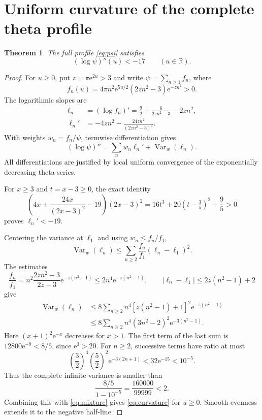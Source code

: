 \documentclass[11pt,letterpaper]{article}
\numberwithin{equation}{section}
\newtheorem{theorem}{Theorem}[section]
\theoremstyle{remark}\newtheorem{remark}[theorem]{Remark}
\newcommand{\R}{\mathbb R}
\newcommand{\ee}{\mathrm e}
\newcommand{\Var}{\operatorname{Var}}
\begin{document}
\section{Uniform curvature of the complete theta profile}
\begin{theorem}\label{thm:curvature}
The full profile \eqref{eq:psi} satisfies
\begin{equation}\label{eq:curvature}
\boxed{(\log\psi)''(u)<-17\qquad(u\in\R).}
\end{equation}
\end{theorem}
\begin{proof}
For $u\ge0$, put $z=\pi\ee^{2u}>3$ and write $\psi=\sum_{n\ge1}f_n$, where
\[
f_n(u)=4\pi n^2\ee^{5u/2}(2zn^2-3)\ee^{-zn^2}>0.
\]
The logarithmic slopes are
\begin{align}
\ell_n&=(\log f_n)'=\frac92+\frac6{2zn^2-3}-2zn^2,\\
\ell_n'&=-4zn^2-\frac{24zn^2}{(2zn^2-3)^2}.
\end{align}
With weights $w_n=f_n/\psi$, termwise differentiation gives
\begin{equation}\label{eq:mixture}
(\log\psi)''=\sum_n w_n\ell_n'+\Var_w(\ell_n).
\end{equation}
All differentiations are justified by local uniform convergence of the exponentially decreasing theta series.

For $x\ge3$ and $t=x-3\ge0$, the exact identity
\begin{equation}
\left(4x+\frac{24x}{(2x-3)^2}-19\right)(2x-3)^2
=16t^3+20(t-\tfrac35)^2+\frac95>0
\end{equation}
proves $\ell_n'<-19$.

Centering the variance at $\ell_1$ and using $w_n\le f_n/f_1$,
\[
\Var_w(\ell_n)\le\sum_{n\ge2}\frac{f_n}{f_1}(\ell_n-\ell_1)^2.
\]
The estimates
\[
\frac{f_n}{f_1}
=n^2\frac{2zn^2-3}{2z-3}\ee^{-z(n^2-1)}
\le2n^4\ee^{-z(n^2-1)},\qquad
|\ell_n-\ell_1|\le2z(n^2-1)+2
\]
give
\begin{align}
\Var_w(\ell_n)
&\le8\sum_{n\ge2}n^4[z(n^2-1)+1]^2\ee^{-z(n^2-1)}\\
&\le8\sum_{n\ge2}n^4(3n^2-2)^2\ee^{-3(n^2-1)}.\label{eq:varianceTail}
\end{align}
Here $(x+1)^2\ee^{-x}$ decreases for $x>1$. The first term of the last sum is $12800\ee^{-9}<8/5$, since $\ee^3>20$. For $n\ge2$, successive terms have ratio at most
\[
\left(\frac32\right)^4\left(\frac52\right)^2\ee^{-3(2n+1)}
<32\ee^{-15}<10^{-5}.
\]
Thus the complete infinite variance is smaller than
\[
\frac{8/5}{1-10^{-5}}=\frac{160000}{99999}<2.
\]
Combining this with \eqref{eq:mixture} gives \eqref{eq:curvature} for $u\ge0$. Smooth evenness extends it to the negative half-line.
\end{proof}
\end{document}
